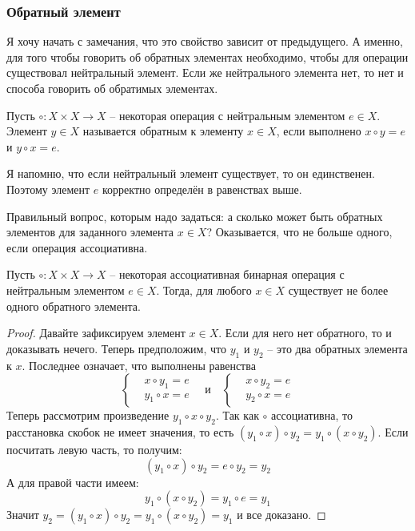 \subsubsection{Обратный элемент}

Я хочу начать с замечания, что это свойство зависит от предыдущего.
А именно, для того чтобы говорить об обратных элементах необходимо, чтобы для операции существовал нейтральный элемент.
Если же нейтрального элемента нет, то нет и способа говорить об обратимых элементах.

\begin{definition}
Пусть $\circ \colon X\times X\to X$ -- некоторая операция с нейтральным элементом $e\in X$.
Элемент $y\in X$ называется обратным к элементу  $x\in X$, если выполнено $x \circ y = e$ и $y \circ x = e$.
\end{definition}

Я напомню, что если нейтральный элемент существует, то он единственен.
Поэтому элемент $e$ корректно определён в равенствах выше.

Правильный вопрос, которым надо задаться: а сколько может быть обратных элементов для заданного элемента $x\in X$?
Оказывается, что не больше одного, если операция ассоциативна.

\begin{claim}
Пусть $\circ \colon X\times X \to X$ -- некоторая ассоциативная бинарная операция с нейтральным элементом $e\in X$.
Тогда, для любого $x \in X$ существует не более одного обратного элемента.
\end{claim}
\begin{proof}
Давайте зафиксируем элемент $x\in X$.
Если для него нет обратного, то и доказывать нечего.
Теперь предположим, что $y_1$ и $y_2$ -- это два обратных элемента к $x$.
Последнее означает, что выполнены равенства
\[
\left\{
\begin{aligned}
&x \circ y_1 = e\\
&y_1 \circ x = e
\end{aligned}
\right.
\quad\text{и}\quad
\left\{
\begin{aligned}
&x \circ y_2 = e\\
&y_2 \circ x = e
\end{aligned}
\right.
\]
Теперь рассмотрим произведение $y_1 \circ x \circ y_2$.
Так как $\circ$ ассоциативна, то расстановка скобок не имеет значения, то есть $(y_1 \circ x) \circ y_2 = y_1 \circ (x \circ y_2)$.
Если посчитать левую часть, то получим:
\[
(y_1 \circ x) \circ y_2 = e \circ y_2 = y_2
\]
А для правой части имеем:
\[
y_1 \circ (x \circ y_2) = y_1 \circ e = y_1
\]
Значит $y_2 = (y_1 \circ x) \circ y_2 = y_1 \circ (x \circ y_2) = y_1$ и все доказано.
\end{proof}

